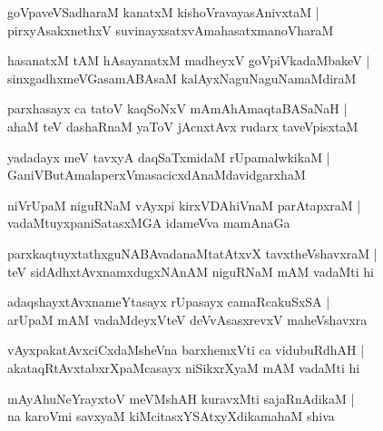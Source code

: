 \documentclass[twoside,12pt,openright]{book}
\newcounter{shloka}[chapter]
\begin{document}
\begin{shloka}%
goVpaveVSadharaM kanatxM kishoVravayasAnivxtaM |\\
pirxyAsakxnethxV suvinayxsatxvAmahasatxmanoVharaM 
\end{shloka}

\begin{shloka}%
hasanatxM tAM hAsayanatxM madheyxV goVpiVkadaMbakeV |\\
sinxgadhxmeVGasamABAsaM kalAyxNaguNaguNamaMdiraM
\end{shloka}

\begin{shloka}%
parxhasayx ca tatoV kaqSoNxV mAmAhAmaqtaBASaNaH |\\
ahaM teV dashaRnaM yaToV jAcnxtAvx rudarx taveVpisxtaM 
\end{shloka}

\begin{shloka}%
yadadayx meV tavxyA daqSaTxmidaM rUpamalwkikaM |\\
GaniVButAmalaperxVmasacicxdAnaMdavidgarxhaM 
\end{shloka}

\begin{shloka}%
niVrUpaM niguRNaM vAyxpi kirxVDAhiVnaM parAtapxraM |\\
vadaMtuyxpaniSatasxMGA idameVva mamAnaGa 
\end{shloka}

\begin{shloka}%
parxkaqtuyxtathxguNABAvadanaMtatAtxvX tavxtheVshavxraM |\\
teV sidAdhxtAvxnamxdugxNAnAM niguRNaM mAM vadaMti hi 
\end{shloka}

\begin{shloka}%
adaqshayxtAvxnameYtasayx rUpasayx camaRcakuSxSA |\\
arUpaM mAM vadaMdeyxVteV deVvAsasxrevxV maheVshavxra
\end{shloka}

\begin{shloka}%
vAyxpakatAvxciCxdaMsheVna barxhemxVti ca vidubuRdhAH |\\
akataqRtAvxtabxrXpaMcasayx niSikxrXyaM mAM vadaMti hi 
\end{shloka}

\begin{shloka}%
mAyAhuNeYrayxtoV meVMshAH kuravxMti sajaRnAdikaM |\\
na karoVmi savxyaM kiMcitasxYSAtxyXdikamahaM shiva 
\end{shloka}
\end{document}
